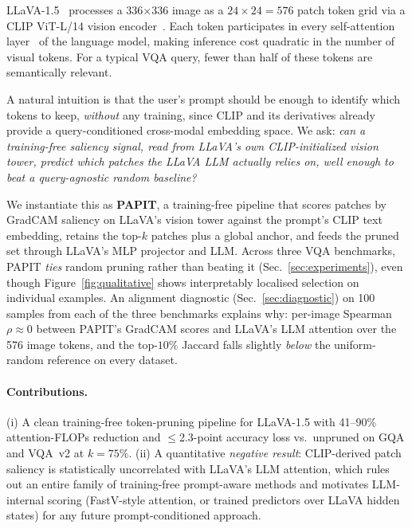 \documentclass[10pt,twocolumn,letterpaper]{article}
\begin{document}
LLaVA-1.5~\cite{liu2024llava15} processes a 336$\times$336 image as a
$24\!\times\!24 = 576$ patch token grid via a CLIP ViT-L/14 vision
encoder~\cite{dosovitskiy2021vit,radford2021clip}. Each token
participates in every self-attention
layer~\cite{vaswani2017attention} of the language model, making
inference cost quadratic in the number of visual tokens. For a typical
VQA query, fewer than half of these tokens are semantically relevant.

A natural intuition is that the user's prompt should be enough to
identify which tokens to keep, \emph{without} any training, since CLIP
and its derivatives already provide a query-conditioned cross-modal
embedding space. We ask: \emph{can a training-free saliency signal,
read from LLaVA's own CLIP-initialized vision tower, predict which
patches the LLaVA LLM actually relies on, well enough to beat a
query-agnostic random baseline?}

We instantiate this as \textbf{PAPIT}, a training-free pipeline that
scores patches by GradCAM saliency on LLaVA's vision tower against
the prompt's CLIP text embedding, retains the top-$k$ patches plus a
global anchor, and feeds the pruned set through LLaVA's MLP projector
and LLM. Across three VQA benchmarks, PAPIT \emph{ties} random
pruning rather than beating it (Sec.~\ref{sec:experiments}), even
though Figure~\ref{fig:qualitative} shows interpretably localised
selection on individual examples. An alignment diagnostic
(Sec.~\ref{sec:diagnostic}) on 100 samples from each of the three
benchmarks explains why: per-image Spearman $\rho \approx 0$ between
PAPIT's GradCAM scores and LLaVA's LLM attention over the 576 image
tokens, and the top-$10\%$ Jaccard falls slightly \emph{below} the
uniform-random reference on every dataset.

\paragraph{Contributions.}
(i) A clean training-free token-pruning pipeline for LLaVA-1.5 with
41--90\% attention-FLOPs reduction and $\le$2.3-point accuracy loss
vs.\ unpruned on GQA and VQA~v2 at $k{=}75\%$. (ii) A quantitative
\emph{negative result}: CLIP-derived patch saliency is statistically
uncorrelated with LLaVA's LLM attention, which rules out an entire
family of training-free prompt-aware methods and motivates
LLM-internal scoring (FastV-style attention, or trained predictors
over LLaVA hidden states) for any future
prompt-conditioned approach.
\end{document}
